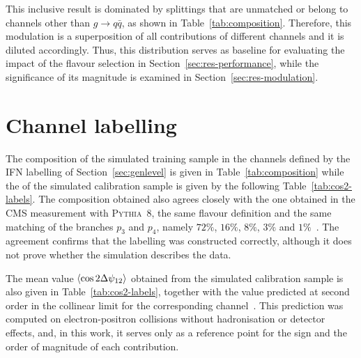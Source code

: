This inclusive result is dominated by splittings that are unmatched or belong to channels
other than $g \to q\bar{q}$, as shown in Table~\ref{tab:composition}. Therefore, this modulation
is a superposition of all contributions of different channels and it is diluted accordingly.
Thus, this distribution serves as baseline for evaluating the impact of the flavour selection 
in Section~\ref{sec:res-performance}, while the significance of its magnitude is examined in Section~\ref{sec:res-modulation}.

\section{Channel labelling}
\label{sec:res-labelling}

The composition of the simulated training sample in the channels defined by the
IFN labelling of Section~\ref{sec:genlevel} is given in
Table~\ref{tab:composition} while the of the simulated calibration sample is given by
the following Table~\ref{tab:cos2-labels}. The composition obtained also agrees closely with 
the one obtained in the
CMS measurement with \textsc{Pythia}~8, the same flavour definition and the same
matching of the branches $p_3$ and $p_4$, namely $72\%$, $16\%$, $8\%$, $3\%$ and
$1\%$~\cite{CMS:2026jnt}. The agreement confirms that the labelling was constructed 
correctly, although it does not prove whether the
simulation describes the data.

The mean value $\langle \cos 2\Delta\psi_{12} \rangle$ obtained from the simulated 
calibration sample is also given in Table~\ref{tab:cos2-labels},
together with the value predicted at second
order in the collinear limit for the corresponding channel~\cite{Karlberg_2021}.
This prediction was computed on electron-positron collisions without hadronisation
or detector effects, and, in this work, it serves only as a reference point for the sign 
and the order of magnitude of each contribution.

